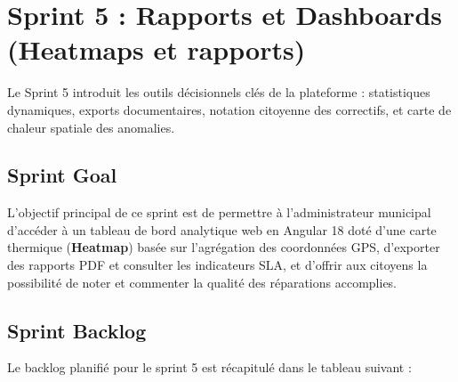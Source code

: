 \section{Sprint 5 : Rapports et Dashboards (Heatmaps et rapports)}
Le Sprint 5 introduit les outils décisionnels clés de la plateforme : statistiques dynamiques, exports documentaires, notation citoyenne des correctifs, et carte de chaleur spatiale des anomalies.

\subsection{Sprint Goal}
L'objectif principal de ce sprint est de permettre à l'administrateur municipal d'accéder à un tableau de bord analytique web en Angular 18 doté d'une carte thermique (\textbf{Heatmap}) basée sur l'agrégation des coordonnées GPS, d'exporter des rapports PDF et consulter les indicateurs SLA, et d'offrir aux citoyens la possibilité de noter et commenter la qualité des réparations accomplies.

\subsection{Sprint Backlog}
Le backlog planifié pour le sprint 5 est récapitulé dans le tableau suivant :

